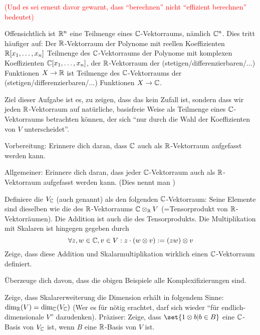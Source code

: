 \begin{sheet}
\begin{problem}[title={Wilde Behauptungen}, difficulty={schwer}]
\medbreak
\textcolor{red}{(Und es sei erneut davor gewarnt, dass \enquote{berechnen} nicht \enquote{effizient berechnen} bedeutet)}
\end{problem}


\begin{problem}[title={Komplexifizierung}]
Offensichtlich ist $\mathbb{R}^n$ eine Teilmenge eines $\mathbb{C}$-Vektorraums, nämlich $\mathbb{C}^n$. Dies tritt häufiger auf: Der $\mathbb{R}$-Vektorraum der Polynome mit reellen Koeffizienten $\mathbb{R}[x_1,\ldots,x_n]$ Teilmenge des $\mathbb{C}$-Vektorraums der Polynome mit komplexen Koeffizienten $\mathbb{C}[x_1,\ldots,x_n]$, der $\mathbb{R}$-Vektorraum der (stetigen/differenzierbaren/...) Funktionen $X\to\mathbb{R}$ ist Teilmenge des $\mathbb{C}$-Vektorraums der (stetigen/differenzierbaren/...) Funktionen $X\to\mathbb{C}$.

\smallbreak
Ziel dieser Aufgabe ist es, zu zeigen, dass das kein Zufall ist, sondern dass wir jeden $\mathbb{R}$-Vektorraum auf natürliche, basisfreie Weise als Teilmenge eines $\mathbb{C}$-Vektorraums betrachten können, der sich \enquote{nur durch die Wahl der Koeffizienten von $V$ unterscheidet}.

\begin{subproblem}
Vorbereitung: Erinnere dich daran, dass $\mathbb{C}$ auch als $\mathbb{R}$-Vektorraum aufgefasst werden kann.

Allgemeiner: Erinnere dich daran, dass jeder $\mathbb{C}$-Vektorraum auch als $\mathbb{R}$-Vektorraum aufgefasst werden kann. (Dies nennt man )
\end{subproblem}

\begin{subproblem}
Definiere die  $V_{\mathbb{C}}$ (auch  genannt) als den folgenden $\mathbb{C}$-Vektorraum: Seine Elemente sind dieselben wie die des $\mathbb{R}$-Vektorraums $\mathbb{C}\otimes_{\mathbb{R}} V$ (=Tensorprodukt von $\mathbb{R}$-Vektorräumen). Die Addition ist auch die des Tensorprodukts. Die Multiplikation mit Skalaren ist hingegen gegeben durch
\[\forall z,w\in\mathbb{C}, v\in V: z\cdot(w\otimes v) := (zw)\otimes v\]
Zeige, dass diese Addition und Skalarmultiplikation wirklich einen $\mathbb{C}$-Vektorraum definiert.
\end{subproblem}

\begin{subproblem}
Überzeuge dich davon, dass die obigen Beispiele alle Komplexifizierungen sind.
\end{subproblem}

\begin{subproblem}
Zeige, dass Skalarerweiterung die Dimension erhält in folgendem Sinne: $\dim_{\mathbb{R}}(V) = \dim_{\mathbb{C}}(V_{\mathbb{C}})$ (Wer es für nötig erachtet, darf sich wieder \enquote{für endlich-dimensionale $V$} dazudenken). Präziser: Zeige, dass $\set{1\otimes b | b\in B}$ eine $\mathbb{C}$-Basis von $V_{\mathbb{C}}$ ist, wenn $B$ eine $\mathbb{R}$-Basis von $V$ ist.
\end{subproblem}


\end{problem}
\end{sheet}
